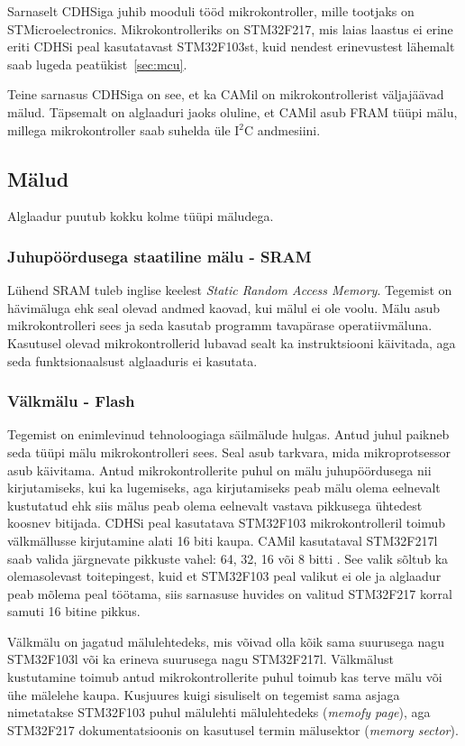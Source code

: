 \documentclass[12pt,a4paper]{article}
\newcommand{\iic}{I${}^2$C }
\begin{document}
Sarnaselt CDHSiga juhib mooduli tööd mikrokontroller, mille tootjaks on
STMicroelectronics. Mikrokontrolleriks on STM32F217, mis laias laastus ei erine
eriti CDHSi peal kasutatavast STM32F103st, kuid nendest erinevustest lähemalt
saab lugeda peatükist~\ref{sec:mcu}.

Teine sarnasus CDHSiga on see, et ka CAMil on mikrokontrollerist väljajäävad
mälud. Täpsemalt on alglaaduri jaoks oluline, et CAMil asub FRAM tüüpi mälu,
millega mikrokontroller saab suhelda üle \iic andmesiini.

\subsection{Mälud}
\label{sec:m2lud}
Alglaadur puutub kokku kolme tüüpi mäludega.

\subsubsection{Juhupöördusega staatiline mälu - SRAM}
Lühend SRAM tuleb inglise keelest \textit{Static Random Access Memory}. Tegemist
on hävimäluga ehk seal olevad andmed kaovad, kui mälul ei ole voolu. Mälu asub
mikrokontrolleri sees ja seda kasutab programm tavapärase operatiivmäluna.
Kasutusel olevad mikrokontrollerid lubavad sealt ka instruktsiooni käivitada,
aga seda funktsionaalsust alglaaduris ei kasutata.

\subsubsection{Välkmälu - Flash}
Tegemist on enimlevinud tehnoloogiaga säilmälude hulgas. Antud juhul paikneb
seda tüüpi mälu mikrokontrolleri sees. Seal asub tarkvara, mida mikroprotsessor
asub käivitama. Antud mikrokontrollerite puhul on mälu juhupöördusega nii
kirjutamiseks, kui ka lugemiseks, aga kirjutamiseks peab mälu olema eelnevalt
kustutatud ehk siis mälus peab olema eelnevalt vastava pikkusega ühtedest
koosnev bitijada. CDHSi peal kasutatava STM32F103 mikrokontrolleril toimub
välkmällusse kirjutamine alati 16 biti kaupa. CAMil kasutataval STM32F217l saab
valida järgnevate pikkuste vahel: 64, 32, 16 või 8 bitti \cite{f2fpm}. See valik
sõltub ka olemasolevast toitepingest, kuid et STM32F103 peal valikut ei ole ja
alglaadur peab mõlema peal töötama, siis sarnasuse huvides on valitud STM32F217
korral samuti 16 bitine pikkus.

Välkmälu on jagatud mälulehtedeks, mis võivad olla kõik sama suurusega nagu
STM32F103l või ka erineva suurusega nagu STM32F217l. Välkmälust kustutamine
toimub antud mikrokontrollerite puhul toimub kas terve mälu või ühe mälelehe
kaupa. Kusjuures kuigi sisuliselt on tegemist sama asjaga nimetatakse STM32F103
puhul mälulehti mälulehtedeks (\textit{memofy page}), aga STM32F217
dokumentatsioonis on kasutusel termin mälusektor (\textit{memory sector}).
\cite{f1fpm,f2fpm}
\end{document}
